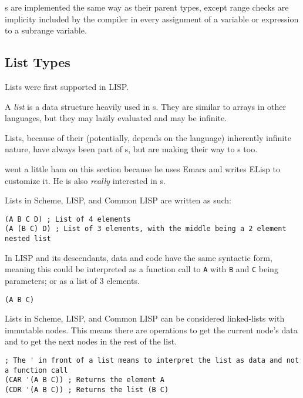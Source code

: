 s are implemented the same way as their parent types, except range checks are implicity included by the compiler in every assignment of a variable or expression to a subrange variable.

\subsection{List Types}\label{subsec:List_Types}
Lists were first supported in LISP.\@
\begin{definition}[List]\label{def:List}
  A \emph{list} is a data structure heavily used in s.
  They are similar to arrays in other languages, but they may lazily evaluated and may be infinite.

  \begin{remark}
    Lists, because of their (potentially, depends on the language) inherently infinite nature, have always been part of s, but are making their way to s too.
  \end{remark}
\end{definition}

\begin{remark*}
  \theauthor{} went a little ham on this section because he uses Emacs and writes ELisp to customize it.
  He is also \emph{really} interested in s.
\end{remark*}

Lists in Scheme, LISP, and Common LISP are written as such:
\begin{verbatim}
(A B C D) ; List of 4 elements
(A (B C) D) ; List of 3 elements, with the middle being a 2 element nested list
\end{verbatim}

In LISP and its descendants, data and code have the same syntactic form, meaning this could be interpreted as a function call to \texttt{A} with \texttt{B} and \texttt{C} being parameters; or as a list of 3 elements.
\begin{verbatim}
(A B C)
\end{verbatim}

Lists in Scheme, LISP, and Common LISP can be considered linked-lists with immutable nodes.
This means there are operations to get the current node's data and to get the next nodes in the rest of the list.
\begin{verbatim}
; The ' in front of a list means to interpret the list as data and not a function call
(CAR '(A B C)) ; Returns the element A
(CDR '(A B C)) ; Returns the list (B C)
\end{verbatim}

